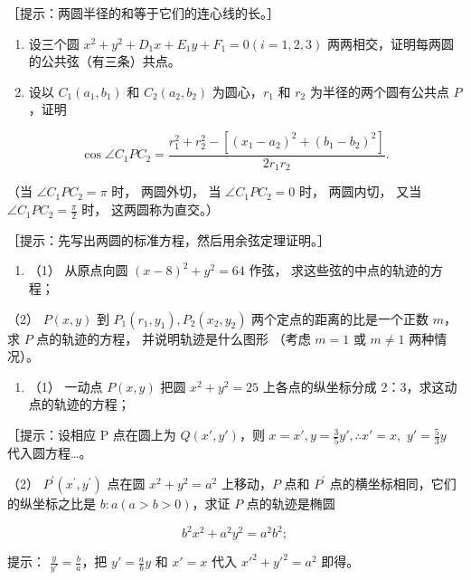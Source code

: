 ［提示：两圆半径的和等于它们的连心线的长。］

\begin{enumerate}
\def\labelenumi{\arabic{enumi}.}
\setcounter{enumi}{13}
\item
  设三个圆 \(x^{2} + y^{2} + D_{1}x + E_{1}y + F_{1} = 0 (i = 1, 2, 3)\)
  两两相交，证明每两圆的公共弦（有三条）共点。
\item
  设以 \(C_{1}(a_{1}, b_{1})\) 和 \(C_{2}(a_{2}, b_{2})\)
  为圆心，\(r_{1}\) 和 \(r_{2}\) 为半径的两个圆有公共点 \(P\)，证明
\end{enumerate}

\[
\cos \angle C_{1} PC_{2} = \frac {r_{1} ^ {2} + r_{2} ^ {2} - [ (x_{1} - a_{2}) ^ {2} + (b_{1} - b_{2}) ^ {2} ]}{2 r_{1} r_{2}}.
\]

（当 \(\angle C_{1}PC_{2} = \pi\) 时， 两圆外切， 当
\(\angle C_{1}PC_{2} = 0\) 时， 两圆内切， 又当
\(\angle C_{1}PC_{2} = \frac{\pi}{2}\) 时， 这两圆称为直交。）

［提示：先写出两圆的标准方程，然后用余弦定理证明。］

\begin{enumerate}
\def\labelenumi{\arabic{enumi}.}
\setcounter{enumi}{15}
\tightlist
\item
  （1） 从原点向圆 \((x - 8)^{2} + y^{2} = 64\) 作弦，
  求这些弦的中点的轨迹的方程；
\end{enumerate}

（2） \(P(x, y)\) 到 \(P_{1}(r_{1}, y_{1}), P_{2}(x_{2}, y_{2})\)
两个定点的距离的比是一个正数 \(m\)， 求 \(P\) 点的轨迹的方程，
并说明轨迹是什么图形 （考虑 \(m = 1\) 或 \(m \neq 1\) 两种情况）。

\begin{enumerate}
\def\labelenumi{\arabic{enumi}.}
\setcounter{enumi}{16}
\tightlist
\item
  （1） 一动点 \(P(x, y)\) 把圆 \(x^{2} + y^{2} = 25\)
  上各点的纵坐标分成 2：3，求这动点的轨迹的方程；
\end{enumerate}

［提示：设相应 P 点在圆上为 \(Q(x', y')\)，则
\(x = x', y = \frac{3}{5}y', \therefore x' = x,\) \(y'=\frac{5}{3}y\)
代入圆方程\ldots。

（2） \(P^{\prime}(x^{\prime},y^{\prime})\) 点在圆
\(x^{2} + y^{2} = a^{2}\) 上移动，\(P\) 点和 \(P^{\prime}\)
点的横坐标相同，它们的纵坐标之比是 \(b: a (a > b > 0)\)，求证 \(P\)
点的轨迹是椭圆

\[
b^{2} x^{2} + a^{2} y^{2} = a^{2} b^{2};
\]

提示： \(\frac{y}{y'}=\frac{b}{a}\)，把 \(y'=\frac{a}{b}y\) 和 \(x'=x\)
代入 \(x'^{2}+y'^{2}=a^{2}\) 即得。

